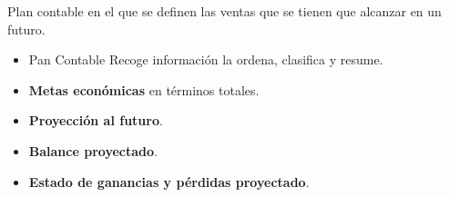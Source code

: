 \Large
Plan contable en el que se definen las ventas que se tienen  que alcanzar en un
futuro.\\

\begin{itemize}
\item Pan Contable Recoge información la ordena, clasifica y resume.\\
\item \textbf{Metas económicas} en términos totales.\\
\item \textbf{Proyección al futuro}.\\
\item \textbf{Balance proyectado}.\\
\item \textbf{Estado de ganancias y pérdidas proyectado}.\\
\end{itemize}

